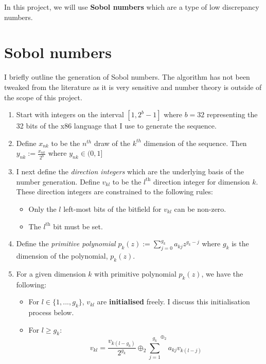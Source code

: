 \documentclass{report}
\theoremstyle{plain}
\theoremstyle{definition}
\begin{document}

In this project, we will use \textbf{Sobol numbers} which are a type of low discrepancy numbers.

\section{Sobol numbers}

I briefly outline the generation of Sobol numbers. The algorithm has not been tweaked from the literature as it is very sensitive and number theory is outside of the scope of this project.\\

\begin{enumerate}
	\item Start with integers on the interval $[1,2^b-1]$ where $b=32$ representing the 32 bits of the x86 language that I use to generate the sequence. 
	\item Define $x_{nk}$ to be the $n^{th}$ draw of the $k^{th}$ dimension of the sequence. Then $y_{nk} := \frac{x_{nk}}{2^b}$ where $y_{nk} \in (0,1]$
	\item I next define the \emph{direction integers} which are the underlying basis of the number generation. Define $v_{kl}$ to be the $l^{\text{th}}$ direction integer for dimension $k$. These direction integers are constrained to the following rules: 
	\begin{itemize}
		\item Only the $l$ left-most bits of the bitfield for $v_{kl}$ can be non-zero.
		\item The $l^{\text{th}}$ bit must be set.
	\end{itemize}
	\item Define the \textit{primitive polynomial} $p_k(z) := \sum_{j=0}^{g_k} a_{kj}z^{g_k-j}$ where $g_k$ is the dimension of the polynomial, $p_k(z)$.
	\item For a given dimension $k$ with primitive polynomial $p_k(z)$, we have the following: 
	\begin{itemize}
		\item For $l \in \{1,...,g_k\}$, $v_{kl}$ are \textbf{initialised} freely. I discuss this initialisation process below.
		\item For $l\ge g_k$: $$v_{kl} = \frac{v_{k(l-g_k)}}{2^{g_k}} \oplus_2 {\sum_{j=1}^{g_k}}^{\oplus_2} a_{kj}v_{k(l-j)}$$
	\end{itemize}

\end{enumerate}
\end{document}

